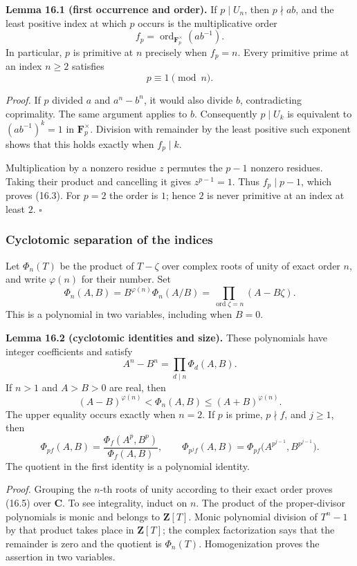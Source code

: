 \documentclass[
  11pt,
  a4paper,
]{article}
\begin{document}
\textbf{Lemma 16.1 (first occurrence and order).} If \(p\mid U_n\), then
\(p\nmid ab\), and the least positive index at which \(p\) occurs is the
multiplicative order \[
 f_p=\operatorname{ord}_{\mathbf F_p^\times}(ab^{-1}).
 \tag{16.2}
\] In particular, \(p\) is primitive at \(n\) precisely when \(f_p=n\).
Every primitive prime at an index \(n\geq2\) satisfies \[
 p\equiv1\pmod n.
 \tag{16.3}
\]

\emph{Proof.} If \(p\) divided \(a\) and \(a^n-b^n\), it would also
divide \(b\), contradicting coprimality. The same argument applies to
\(b\). Consequently \(p\mid U_k\) is equivalent to \((ab^{-1})^k=1\) in
\(\mathbf F_p^\times\). Division with remainder by the least positive
such exponent shows that this holds exactly when \(f_p\mid k\).

Multiplication by a nonzero residue \(z\) permutes the \(p-1\) nonzero
residues. Taking their product and cancelling it gives \(z^{p-1}=1\).
Thus \(f_p\mid p-1\), which proves (16.3). For \(p=2\) the order is
\(1\); hence \(2\) is never primitive at an index at least \(2\).
\(\square\)

\subsubsection{Cyclotomic separation of the
indices}\label{cyclotomic-separation-of-the-indices}

Let \(\Phi_n(T)\) be the product of \(T-\zeta\) over complex roots of
unity of exact order \(n\), and write \(\varphi(n)\) for their number.
Set \[
 \Phi_n(A,B)=B^{\varphi(n)}\Phi_n(A/B)
            =\prod_{\operatorname{ord}\zeta=n}(A-B\zeta).
 \tag{16.4}
\] This is a polynomial in two variables, including when \(B=0\).

\textbf{Lemma 16.2 (cyclotomic identities and size).} These polynomials
have integer coefficients and satisfy \[
 A^n-B^n=\prod_{d\mid n}\Phi_d(A,B).
 \tag{16.5}
\] If \(n>1\) and \(A>B>0\) are real, then \[
 (A-B)^{\varphi(n)}<\Phi_n(A,B)\leq(A+B)^{\varphi(n)}.
 \tag{16.6}
\] The upper equality occurs exactly when \(n=2\). If \(p\) is prime,
\(p\nmid f\), and \(j\geq1\), then \[
 \Phi_{pf}(A,B)=\frac{\Phi_f(A^p,B^p)}{\Phi_f(A,B)},\qquad
 \Phi_{p^jf}(A,B)
   =\Phi_{pf}\bigl(A^{p^{j-1}},B^{p^{j-1}}\bigr).
 \tag{16.7}
\] The quotient in the first identity is a polynomial identity.

\emph{Proof.} Grouping the \(n\)-th roots of unity according to their
exact order proves (16.5) over \(\mathbf C\). To see integrality, induct
on \(n\). The product of the proper-divisor polynomials is monic and
belongs to \(\mathbf Z[T]\). Monic polynomial division of \(T^n-1\) by
that product takes place in \(\mathbf Z[T]\); the complex factorization
says that the remainder is zero and the quotient is \(\Phi_n(T)\).
Homogenization proves the assertion in two variables.
\end{document}

